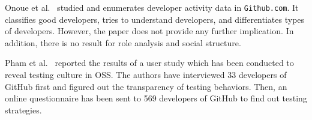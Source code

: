 Onoue et al.~\cite{onoue_study_2013} studied and enumerates developer activity
data in \texttt{Github.com}.
It classifies good developers, tries to understand developers, and
differentiates types of developers. However, the paper does not provide any
further implication. In addition, there is no result for role analysis and 
social structure.

Pham et al.~\cite{pham_creating_2013} reported the results of a user study which
has been conducted to reveal testing culture in OSS. The authors have
interviewed 33 developers of GitHub first and figured out the transparency of
testing behaviors. Then, an online questionnaire has been sent to 569 developers
of GitHub to find out testing strategies.
